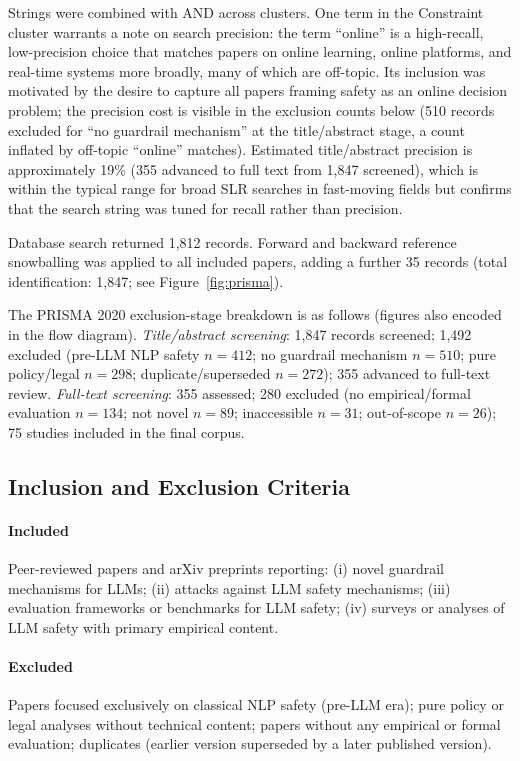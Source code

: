 Strings were combined with AND across clusters.
One term in the Constraint cluster warrants a note on search precision: the term
``online'' is a high-recall, low-precision choice that matches papers on online
learning, online platforms, and real-time systems more broadly, many of which are
off-topic.
Its inclusion was motivated by the desire to capture all papers framing safety as
an online decision problem; the precision cost is visible in the exclusion counts
below (510 records excluded for ``no guardrail mechanism'' at the title/abstract
stage, a count inflated by off-topic ``online'' matches).
Estimated title/abstract precision is approximately 19\% (355 advanced to full
text from 1,847 screened), which is within the typical range for broad SLR searches
in fast-moving fields but confirms that the search string was tuned for recall
rather than precision.

Database search returned 1,812 records.
Forward and backward reference snowballing was applied to all included papers,
adding a further 35 records (total identification: 1,847; see Figure~\ref{fig:prisma}).
\begin{sloppypar}
The PRISMA 2020 exclusion-stage breakdown is as follows (figures also encoded
in the flow diagram).
\textit{Title/abstract screening}: 1,847 records screened;
1,492 excluded (pre-LLM NLP safety $n=412$; no guardrail mechanism $n=510$;
pure policy/legal $n=298$; duplicate/superseded $n=272$);
355 advanced to full-text review.
\textit{Full-text screening}: 355 assessed;
280 excluded (no empirical/formal evaluation $n=134$;
not novel $n=89$; inaccessible $n=31$; out-of-scope $n=26$);
75 studies included in the final corpus.
\end{sloppypar}

\subsection{Inclusion and Exclusion Criteria}

\paragraph{Included} Peer-reviewed papers and arXiv preprints reporting: (i) novel
guardrail mechanisms for LLMs; (ii) attacks against LLM safety mechanisms; (iii)
evaluation frameworks or benchmarks for LLM safety; (iv) surveys or analyses of
LLM safety with primary empirical content.

\paragraph{Excluded} Papers focused exclusively on classical NLP safety (pre-LLM
era); pure policy or legal analyses without technical content; papers without any
empirical or formal evaluation; duplicates (earlier version superseded by a later
published version).


